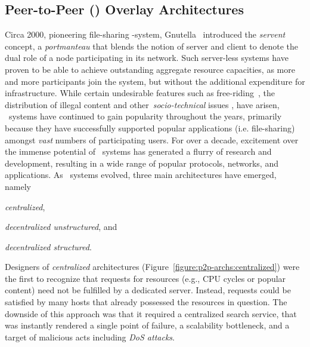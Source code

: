 \subsection{Peer-to-Peer (\p) Overlay Architectures}
Circa 2000, pioneering file-sharing \p-system,
Gnutella~\cite{gnutellav04,gnutella} introduced the \emph{servent }concept, a
\emph{portmanteau} that blends the notion of server
and client to denote the dual role of a node participating in its network.
Such server-less systems have proven to be able to achieve outstanding
aggregate resource capacities, as more and more participants join the system,
but without the additional expenditure for infrastructure.
While certain undesirable features such as 
free-riding~\cite{saroiu_measurefileshare_2002,adar_gnutellafreeriders_2000,hughes_gnutellafreeride_2005},
the distribution of illegal content and other~\emph{socio-technical}
issues \cite{hughes_socp2p_2008}, have arisen, \p\ systems have
continued to gain popularity throughout the years, primarily 
because they have successfully supported popular applications 
(i.e. file-sharing) amongst \emph{vast} numbers of participating users.
For over a decade, excitement over the immense potential of \p\ systems has
generated a flurry of research and development, resulting in a wide range of
popular protocols, networks, and applications. As \p\ systems evolved, three
main architectures have emerged, namely
\begin{inparaenum}
  \item \emph{centralized},
  \item \emph{decentralized unstructured}, and
  \item \emph{decentralized structured}.
\end{inparaenum}

Designers of \emph{centralized} architectures 
(Figure~\ref{figure:p2p-archs:centralized}) were the first 
to recognize that requests for resources 
(e.g., CPU cycles or popular content) need not be fulfilled by
a dedicated server. Instead, requests could be satisfied by
many hosts that already possessed the resources in question. 
The downside of this approach was that it required a
centralized search service, that was instantly rendered a single point of
failure,  a scalability bottleneck, and a target of malicious acts including
\emph{DoS attacks}.

